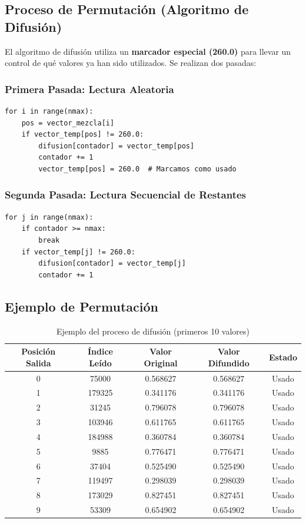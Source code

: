 \documentclass[12pt,a4paper]{article}
\begin{document}
\subsection{Proceso de Permutación (Algoritmo de Difusión)}

El algoritmo de difusión utiliza un \textbf{marcador especial (260.0)} para llevar un control de qué valores ya han sido utilizados. Se realizan dos pasadas:

\subsubsection{Primera Pasada: Lectura Aleatoria}
\begin{lstlisting}
for i in range(nmax):
    pos = vector_mezcla[i]
    if vector_temp[pos] != 260.0:
        difusion[contador] = vector_temp[pos]
        contador += 1
        vector_temp[pos] = 260.0  # Marcamos como usado
\end{lstlisting}

\subsubsection{Segunda Pasada: Lectura Secuencial de Restantes}
\begin{lstlisting}
for j in range(nmax):
    if contador >= nmax:
        break
    if vector_temp[j] != 260.0:
        difusion[contador] = vector_temp[j]
        contador += 1
\end{lstlisting}

\subsection{Ejemplo de Permutación}

\begin{table}[H]
\centering
\caption{Ejemplo del proceso de difusión (primeros 10 valores)}
\label{tab:diffusion}
\begin{tabular}{@{}ccccc@{}}
\toprule
\textbf{Posición Salida} & \textbf{Índice Leído} & \textbf{Valor Original} & \textbf{Valor Difundido} & \textbf{Estado} \\ \midrule
0 & 75000 & 0.568627 & 0.568627 & Usado \\
1 & 179325 & 0.341176 & 0.341176 & Usado \\
2 & 31245 & 0.796078 & 0.796078 & Usado \\
3 & 103946 & 0.611765 & 0.611765 & Usado \\
4 & 184988 & 0.360784 & 0.360784 & Usado \\
5 & 9885 & 0.776471 & 0.776471 & Usado \\
6 & 37404 & 0.525490 & 0.525490 & Usado \\
7 & 119497 & 0.298039 & 0.298039 & Usado \\
8 & 173029 & 0.827451 & 0.827451 & Usado \\
9 & 53309 & 0.654902 & 0.654902 & Usado \\ \bottomrule
\end{tabular}
\end{table}
\end{document}
